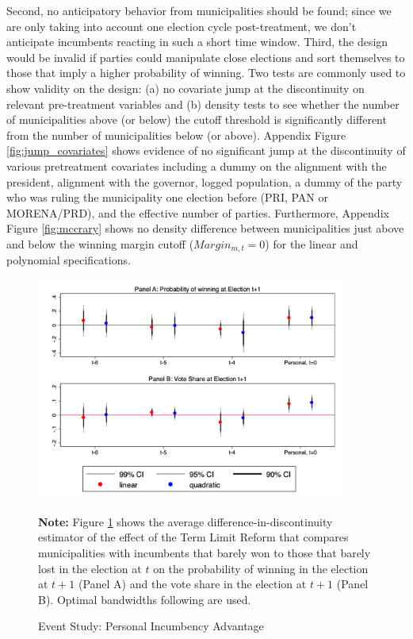Second, no anticipatory behavior from municipalities should be found; since we are only taking into account one election cycle post-treatment, we don't anticipate incumbents reacting in such a short time window. Third, the design would be invalid if parties could manipulate close elections and sort themselves to those that imply a higher probability of winning. Two tests are commonly used to show validity on the design: (a) no covariate jump at the discontinuity on relevant pre-treatment variables and (b) density tests to see whether the number of municipalities above (or below) the cutoff threshold is significantly different from the number of municipalities below (or above). Appendix Figure \ref{fig:jump_covariates} shows evidence of no significant jump at the discontinuity of various pretreatment covariates including a dummy on the alignment with the president, alignment with the governor, logged population, a dummy of the party who was ruling the municipality one election before (PRI, PAN or MORENA/PRD), and the effective number of parties. Furthermore, Appendix Figure \ref{fig:mccrary} shows no density difference between municipalities just above and below the winning margin cutoff ($Margin_{m,t}=0$) for the linear and polynomial specifications. 

\begin{figure}[H]   
\centering    
 \caption{Event Study: Personal Incumbency Advantage}
 \label{fig:event_study_personal}
\includegraphics[width=0.9\textwidth]{Chapter2/Figures_incumbency/event_study.png}
       \captionsetup{justification=centering}
         
 \textbf{Note:} Figure \ref{fig:event_study_personal} shows the average difference-in-discontinuity estimator of the effect of the Term Limit Reform that compares municipalities with incumbents that barely won to those that barely lost in the election at $t$ on the probability of winning in the election at $t+1$ (Panel A) and the vote share in the  election at $t+1$ (Panel B). Optimal bandwidths following \citet{calonicoetal_2014} are used. 
  
\end{figure}  
 
